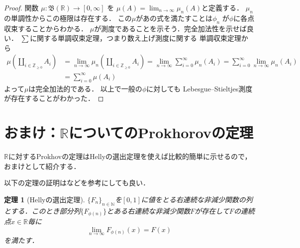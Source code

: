 \documentclass[leqno, a4paper, 12pt]{jsarticle}
\newtheorem{thm}{定理}
\newcommand{\nn}{\mathbb{N}}
\newcommand{\zz}{\mathbb{Z}}
\newcommand{\rr}{\mathbb{R}}
\begin{document}
\begin{proof}
関数
$\mu: \mathfrak{B}(\rr)\to [0, \infty]$
を
$\mu(A)=\lim_{n\to \infty}\mu_{n}(A)$と定義する．
$\mu_{n}$の単調性からこの極限は存在する．
この$\mu$があの式を満たすことは$\phi_{n}$
が$\phi$に各点収束することからわかる．
$\mu$が測度であることを示そう．完全加法性を示せば良い．
$\sum$に関する単調収束定理，つまり数え上げ測度に関する
単調収束定理から
\begin{align*}
\mu\left(\coprod_{i\in \zz_{\ge 0}}A_{i}\right)
&=\lim_{n\to \infty}\mu_{n}\left(\coprod_{i\in \zz_{\ge 0}}A_{i}\right)
=
\lim_{n\to \infty}\sum_{i=0}^{\infty}\mu_{n}\left(A_{i}\right)
=
\sum_{i=0}^{\infty}\lim_{n\to \infty}\mu_{n}\left(A_{i}\right)\\
&=
\sum_{i=0}^{\infty}\mu\left(A_{i}\right)
\end{align*}
よって$\mu$は完全加法的である．
以上で一般の$\phi$に対しても
Lebesgue--Stieltjes測度が存在することがわかった．
\end{proof}


\section{おまけ：$\rr$についてのProkhorovの定理}
$\rr$に対するProkhovの定理はHellyの選出定理を使えば比較的簡単に示せるので，おまけとして紹介する．

以下の定理の証明は\cite{Helly}などを参考にしても良い．
\begin{thm}[Hellyの選出定理]\label{daiji3}
$\{F_n\}_{n\in \nn}$を$[0, 1]$に値をとる右連続な非減少関数の列とする．このとき部分列$\{F_{\phi(n)}\}$とある右連続な非減少関数$F$が存在して$F$の連続点$x\in \rr$毎に
\[
\lim_{n\to \infty}F_{\phi(n)}(x)=F(x)
\]
を満たす．
\end{thm}
\end{document}
